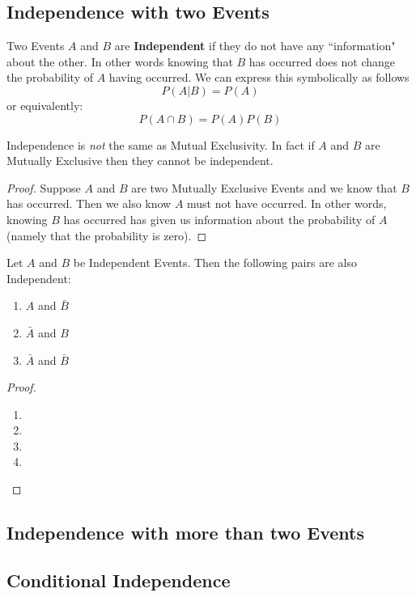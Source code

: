 \documentclass{report}
\begin{document}
\subsection{Independence with two Events}
Two Events $A$ and $B$ are \textbf{Independent} if they do not have any ``information" about the other. In other words knowing that $B$ has occurred does not change the probability of $A$ having occurred. We can express this symbolically as follows
\[
    P(A|B)=P(A)
\]
or equivalently:
\[
    P(A\cap B)=P(A)P(B)
\]
\begin{notsofast}
    Independence is \emph{not} the same as Mutual Exclusivity. In fact if $A$ and $B$ are Mutually Exclusive then they cannot be independent. 
    \begin{proof}
        Suppose $A$ and $B$ are two Mutually Exclusive Events and we know that $B$ has occurred. Then we also know $A$ must not have occurred. In other words, knowing $B$ has occurred has given us information about the probability of $A$ (namely that the probability is zero). 
    \end{proof}
\end{notsofast}

\begin{lemma}
Let $A$ and $B$ be Independent Events. Then the following pairs are also Independent:
\begin{enumerate}
    \item $A$ and $\bar B$
    \item $\bar A$ and $B$
    \item $\bar A$ and $\bar B$
\end{enumerate}

\begin{proof}
    \begin{enumerate}
        \item[]
        \item\todo
        \item\todo
        \item \todo
    \end{enumerate}
\end{proof}
\end{lemma}

\subsection{Independence with more than two Events}

\subsection{Conditional Independence}
\end{document}
